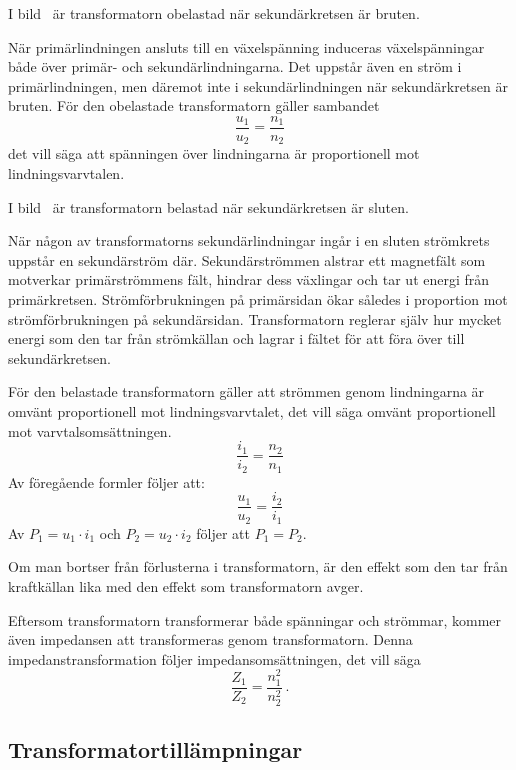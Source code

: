 
I bild~ är transformatorn obelastad när sekundärkretsen är
bruten.

När primärlindningen ansluts till en växelspänning induceras växelspänningar
både över primär- och sekundärlindningarna.
Det uppstår även en ström i primärlindningen, men däremot inte i
sekundärlindningen när sekundärkretsen är bruten.
För den obelastade transformatorn gäller sambandet
\[\dfrac{u_1}{u_2} = \dfrac{n_1}{n_2}\]
det vill säga att spänningen över lindningarna är proportionell mot lindningsvarvtalen.

I bild~ är transformatorn belastad när sekundärkretsen
är sluten.

När någon av transformatorns sekundärlindningar ingår i en sluten strömkrets 
uppstår en sekundärström där.
%
Sekundärströmmen alstrar ett magnetfält som motverkar primärströmmens fält,
hindrar dess växlingar och tar ut energi från primärkretsen.
%
Strömförbrukningen på primärsidan ökar således i proportion mot
strömförbrukningen på sekundärsidan. Transformatorn reglerar själv hur mycket
energi som den tar från strömkällan och lagrar i fältet för att föra över
till sekundärkretsen.

\newpage
För den belastade transformatorn gäller att strömmen genom lindningarna är
omvänt proportionell mot lindningsvarvtalet, det vill säga omvänt proportionell 
mot varvtalsomsättningen.
\[\dfrac{i_1}{i_2} = \dfrac{n_2}{n_1}\]
Av föregående formler följer att:
\[\dfrac{u_1}{u_2} = \dfrac{i_2}{i_1}\]
Av \(P_1 = u_1 \cdot i_1\) och \(P_2 = u_2 \cdot i_2\) följer att \(P_1 = P_2\).

Om man bortser från förlusterna i transformatorn, är den effekt som den tar
från kraftkällan lika med den effekt som transformatorn avger.

Eftersom transformatorn transformerar både spänningar och strömmar, kommer
även impedansen att transformeras genom transformatorn.
Denna impedanstransformation följer impedansomsättningen, det vill säga
\[\dfrac{Z_1}{Z_2} = \dfrac{n_1^2}{n_2^2}~.\]

\newpage
\subsection{Transformatortillämpningar}

